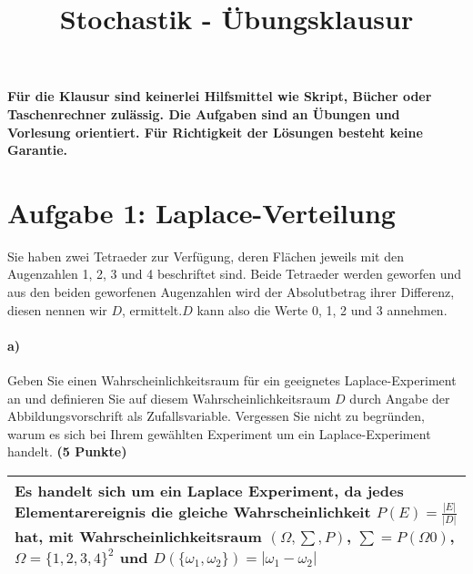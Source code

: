 \documentclass[10pt, a4paper]{article}
\title{Stochastik - Übungsklausur}
\author{}
\date{}
\begin{document}
\maketitle
\textbf{Für die Klausur sind keinerlei Hilfsmittel wie Skript, Bücher oder Taschenrechner zulässig. Die Aufgaben sind an Übungen und Vorlesung orientiert. Für Richtigkeit der Lösungen besteht keine Garantie.}

\section{Aufgabe 1: Laplace-Verteilung}
Sie haben zwei Tetraeder zur Verfügung, deren Flächen jeweils mit den Augenzahlen 1, 2, 3 und 4 beschriftet sind. Beide Tetraeder werden geworfen und aus den beiden geworfenen Augenzahlen wird der Absolutbetrag ihrer Differenz, diesen nennen wir $D$, ermittelt.$D$ kann also die Werte 0, 1, 2 und 3 annehmen.

\paragraph{a)} Geben Sie einen Wahrscheinlichkeitsraum für ein geeignetes Laplace-Experiment an und definieren Sie auf diesem Wahrscheinlichkeitsraum $D$ durch Angabe der Abbildungsvorschrift als Zufallsvariable. Vergessen Sie nicht zu begründen, warum es sich bei Ihrem gewählten Experiment um ein Laplace-Experiment handelt. \textbf{(5 Punkte)}\\
\begin{tabular}{| p{17cm} |}
    \hline
    Es handelt sich um ein Laplace Experiment, da jedes Elementarereignis die gleiche Wahrscheinlichkeit $P(E)=\frac{|E|}{|D|}$ hat, mit Wahrscheinlichkeitsraum $(\Omega,\sum,P)$, $\sum=P(\Omega0)$, $\Omega= \{1,2,3,4\}^2$ und $D(\{\omega_1,\omega_2\})=|\omega_1-\omega_2|$
    \\\hline
\end{tabular}
\end{document}
